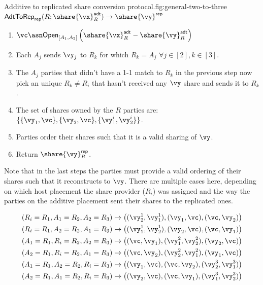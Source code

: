 \begin{Boxfig}{Additive to replicated share conversion
protocol.}{fig:general-two-to-three}{$\mathsf{AdtToRep}_\mathsf{rep}(R;
\share{\vx}^{\mathsf{adt}}_{R}) \rightarrow \share{\vy}^\mathsf{rep}$}
\begin{enumerate}
\item $\vc \asn \mathsf{Open}_{[A_1, A_2]}\left( \share{\vx}^{\mathsf{adt}}_{R}
- \share{\vy}^{\mathsf{adt}}_{R} \right)$
\item Each $A_j$ sends $\vy_j$ to $R_k$ for which $R_k = A_j$ $\forall j \in [2], k \in [3]$.
\item The $A_j$ parties that didn't have a 1-1 match to $R_k$ in the previous step now pick an unique $R_k \neq R_i$
that hasn't received any $\vy$ share and sends it to $R_k$.
\item The set of shares owned by the $R$ parties are: $\{ \{\vy_1, \vc\}, \{\vy_2, \vc\}, \{\vy^i_1, \vy^i_2\} \}$.
\item Parties order their shares such that it is a valid sharing of $\vy$.
\item Return $\share{\vy}^{\mathsf{rep}}_{R}$.
\end{enumerate}
\end{Boxfig}

Note that in the last steps the parties must provide a valid ordering of their
shares such that it reconstructs to $\vy$. There are multiple cases here,
depending on which host placement the share provider ($R_i$) was assigned and
the way the parties on the additive placement sent their shares to the replicated ones.

\begin{align*}
(R_i = R_1, A_1 = R_2, A_2 = R_3) \mapsto \left( (\vy_2^1, \vy_1^1), (\vy_1, \vc), (\vc, \vy_2) \right) \\
(R_i = R_1, A_2 = R_2, A_1 = R_3) \mapsto \left( (\vy_1^1, \vy_2^1), (\vy_2, \vc), (\vc, \vy_1) \right) \\
(A_1 = R_1, R_i = R_2, A_2 = R_3) \mapsto \left( (\vc, \vy_1), (\vy^2_1, \vy^2_2), (\vy_2, \vc) \right) \\
(A_2 = R_1, R_i = R_2, A_1 = R_3) \mapsto \left( (\vc, \vy_2), (\vy^2_2, \vy^2_1), (\vy_1, \vc) \right) \\
(A_1 = R_1, A_2 = R_2, R_i = R_3) \mapsto \left( (\vy_1, \vc), (\vc, \vy_2), (\vy_2^3, \vy_1^3) \right) \\
(A_2 = R_1, A_1 = R_2, R_i = R_3) \mapsto \left( (\vy_2, \vc), (\vc, \vy_1), (\vy_1^3, \vy_2^3) \right)
\end{align*}